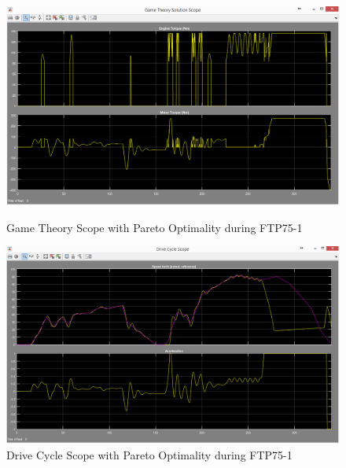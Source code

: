 \begin{figure}[hp]
\centering
\includegraphics[scale=0.43]{figures/Pareto/FTP75-1/gameTheory30Juni}
\caption{Game Theory Scope with Pareto Optimality during FTP75-1}
\label{fig:gtpo1}

\includegraphics[scale=0.41]{figures/Pareto/FTP75-1/driveCycle30Juni}
\caption{Drive Cycle Scope with Pareto Optimality during FTP75-1}
\label{fig:dcpo1}
\end{figure}


